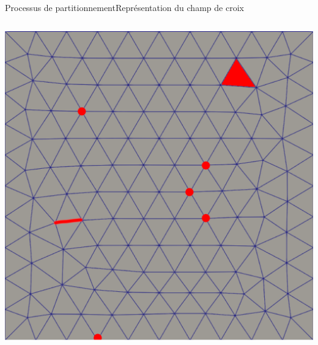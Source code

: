 \documentclass[compress,10pt,aspectratio=169]{beamer}
\begin{document}
\begin{frame}{Processus de partitionnement}{Représentation du champ de croix}
\begin{columns}
\begin{column}{0.2\textwidth}
{    \includegraphics[scale=0.11]{images/zone_singuliere_1.pdf}  \\\vspace{0.2cm}}
\end{column}
\end{columns}
\end{frame}
\end{document}
